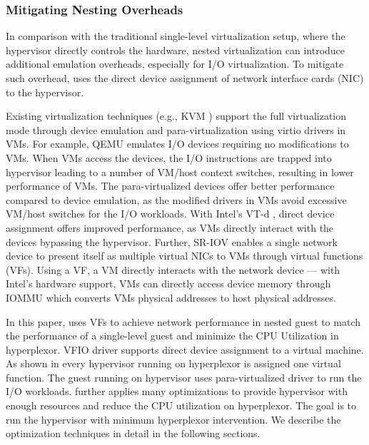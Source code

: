 
\subsubsection{Mitigating Nesting Overheads}
\label{sec:overhead}
In comparison with the traditional single-level virtualization 
setup, where the hypervisor directly controls the hardware,
nested virtualization can introduce additional emulation overheads, especially for I/O virtualization. To mitigate such overhead, \arch uses the direct device assignment of network interface cards (NIC) to the hypervisor. 

Existing virtualization techniques (e.g., KVM \cite{kivity2007kvm}) support the full virtualization mode through device emulation \cite{sugerman2001virtualizing} and para-virtualization using virtio drivers \cite{russell2008virtio, barham2003xen}  in VMs. 
For example, QEMU \cite{bellard2005qemu} emulates I/O devices requiring no modifications to VMs. When VMs access the devices, the I/O instructions are trapped into hypervisor leading to a number of VM/host context switches, resulting in lower performance of VMs. The para-virtualized devices offer better performance compared to device emulation, as the modified drivers in VMs avoid excessive VM/host switches for the I/O workloads. With Intel's VT-d \cite{abramson2006intel}, direct device assignment offers improved performance, as VMs directly interact with the devices bypassing the hypervisor.    
Further, SR-IOV \cite{dong2008sr} enables a single network device to present itself as multiple virtual NICs to VMs through virtual functions (VFs). Using a VF, a VM directly interacts with the network device --- with Intel's hardware support, VMs can directly access device memory through IOMMU which converts VMs physical addresses to host physical addresses.

In this paper, \arch uses VFs to achieve network performance in nested guest to match the performance of a single-level guest and minimize the CPU Utilization in hyperplexor. VFIO \cite{vfiodriver} driver supports direct device assignment to a virtual machine. As shown in  every hypervisor running on hyperplexor is assigned one virtual function. The guest running on hypervisor uses para-virtualized driver to run the I/O workloads. \arch further applies many optimizations to provide hypervisor with enough resources and reduce the CPU utilization on hyperplexor. The goal is to run the hypervisor with minimum hyperplexor intervention. We describe the optimization techniques in detail in the following sections.

